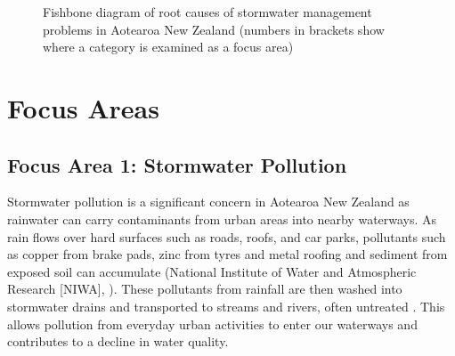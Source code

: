\documentclass[11pt,a4paper]{article}
\begin{document}
\begin{figure}[htbp]

  \caption{Fishbone diagram of root causes of stormwater management problems in Aotearoa New Zealand (numbers in brackets show where a category is examined as a focus area)}
  \label{fig:fishbone}
\end{figure}

\section{Focus Areas}

\subsection{Focus Area 1: Stormwater Pollution}

Stormwater pollution is a significant concern in Aotearoa New Zealand as rainwater can carry contaminants from urban areas into nearby waterways. As rain flows over hard surfaces such as roads, roofs, and car parks, pollutants such as copper from brake pads, zinc from tyres and metal roofing and sediment from exposed soil can accumulate (National Institute of Water and Atmospheric Research [NIWA], \citeyear{niwa2021}). These pollutants from rainfall are then washed into stormwater drains and transported to streams and rivers, often untreated \citep{mfe_stats2020}. This allows pollution from everyday urban activities to enter our waterways and contributes to a decline in water quality.
\end{document}
